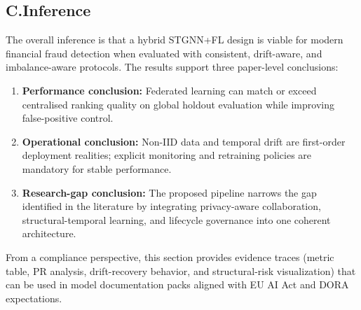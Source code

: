 \documentclass[12pt, a4paper]{article}
\begin{document}
\subsection{C.\quad Inference}

The overall inference is that a hybrid STGNN+FL design is viable for modern financial fraud detection when evaluated with consistent, drift-aware, and imbalance-aware protocols. The results support three paper-level conclusions:

\begin{enumerate}[leftmargin=2.3em, itemsep=4pt]
  \item \textbf{Performance conclusion:} Federated learning can match or exceed centralised ranking quality on global holdout evaluation while improving false-positive control.
  \item \textbf{Operational conclusion:} Non-IID data and temporal drift are first-order deployment realities; explicit monitoring and retraining policies are mandatory for stable performance.
  \item \textbf{Research-gap conclusion:} The proposed pipeline narrows the gap identified in the literature by integrating privacy-aware collaboration, structural-temporal learning, and lifecycle governance into one coherent architecture.
\end{enumerate}

From a compliance perspective, this section provides evidence traces (metric table, PR analysis, drift-recovery behavior, and structural-risk visualization) that can be used in model documentation packs aligned with EU AI Act and DORA expectations.
 
\newpage
\printbibliography[heading=bibintoc, title={References}, env=bibliography]
 
\end{document}
